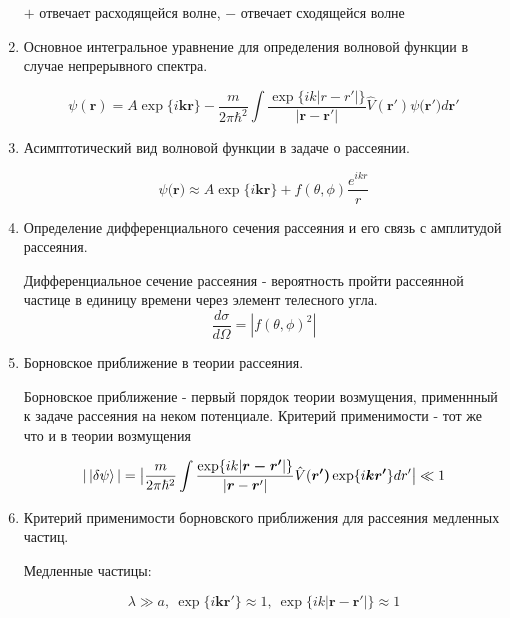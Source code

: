 \documentclass{article}
\begin{document}
\begin{enumerate}
		$+$ отвечает расходящейся волне, $-$ отвечает сходящейся волне
		
		\item {Основное интегральное уравнение для определения волновой функции в случае непрерывного спектра.}
		
		\begin{equation}
			\psi(\boldsymbol{r})=A\exp\{i\boldsymbol{kr}\}-\frac{m}{2\pi\hbar^{2}}\int\frac{\exp\{ik|r-r'|\}}{|\boldsymbol{r-r'}|}\hat{V}(\boldsymbol{r'})\psi(\boldsymbol{r')}d\boldsymbol{r'}
		\end{equation}
		
		\item {Асимптотический вид волновой функции в задаче о рассеянии.}
		
		\begin{equation}
			\psi(\boldsymbol{r)}\approx A\exp\{i\boldsymbol{kr}\}+f(\theta,\phi)\frac{e^{ikr}}{r}
		\end{equation}
		
		\item {Определение дифференциального сечения рассеяния и его связь с амплитудой рассеяния.}
		
		Дифференциальное сечение рассеяния - вероятность пройти рассеянной
частице в единицу времени через элемент телесного угла.
		\begin{equation}
			\frac{d\sigma}{d\Omega}=|f(\theta,\phi)^{2}|
		\end{equation}
		
		\item {Борновское приближение в теории рассеяния.}

		Борновское приближение - первый порядок теории возмущения, применнный
к задаче рассеяния на неком потенциале. Критерий применимости -  тот же
что и в теории возмущения

		\begin{equation}
			|\ket{\delta\psi}|=\big|\frac{m}{2\pi\hbar^{2}}\int\frac{\exp\{ik|\boldsymbol{r-r'}|\}}{|\boldsymbol{r}-\boldsymbol{r}'|}\hat{V}(\boldsymbol{r')}\exp\{i\boldsymbol{kr'}\}dr'\big|\ll1
		\end{equation}
		
		\item {Критерий применимости борновского приближения для рассеяния медленных частиц.}
		
		Медленные частицы:
		
		\begin{equation}
			\lambda\gg a,\ \exp\{i\boldsymbol{kr'}\}\approx1,\ \exp\{ik|\boldsymbol{r-r'}|\}\approx1
		\end{equation}
		

\end{enumerate}
\end{document}
